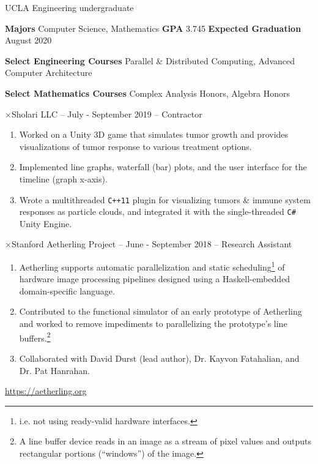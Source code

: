 \documentclass[11pt]{article}
\newcommand{\web}[1]{{ \color{webColor} \small \url{#1}}}
\newcommand{\myTitle}[1]{\vspace{2mm}{ \LARGE \color{titleColor} \textsf{#1}\vspace{2mm}}}
\newcommand{\mySub}[1]{{\color{subColor}$\times$\hspace{1mm}\textsf{#1}}}
\newcommand{\myKey}[1]{{\color{keyColor}\textbf{#1}}}
\newcommand{\GPA}{3.745}
\begin{document}
\begin{center}
\myTitle{David Zhao Akeley}

\vspace{-2.5mm}
{ \color{subColor} \textsf{UCLA Engineering undergraduate} }
\end{center}


\myKey{Majors} Computer Science, Mathematics
\hfill \myKey{GPA} \GPA
\hfill \myKey{Expected Graduation} August 2020

\myKey{Select Engineering Courses} Parallel \& Distributed Computing,
Advanced Computer Architecture

\myKey{Select Mathematics Courses} Complex Analysis Honors, Algebra Honors
\vspace{3mm}

\myTitle{Work Experience}

\mySub{Sholari LLC -- July - September 2019 -- Contractor}
\begin{enumerate}
\item Worked on a Unity 3D game that simulates tumor growth and
  provides visualizations of tumor response to various treatment
  options.
\item Implemented line graphs, waterfall (bar) plots, and the user
  interface for the timeline (graph x-axis).
\item Wrote a multithreaded \texttt{C++11} plugin for visualizing
  tumors \& immune system responses as particle clouds, and integrated
  it with the single-threaded \texttt{C\#} Unity Engine.
\end{enumerate}

\mySub{Stanford Aetherling Project -- June - September 2018 --
  Research Assistant}
\begin{enumerate}
\item Aetherling supports automatic parallelization and static
  scheduling\footnote{i.e. not using ready-valid hardware interfaces.}
  of hardware image processing pipelines designed using a
  Haskell-embedded domain-specific language.
\item Contributed to the functional simulator of an early prototype of
  Aetherling and worked to remove impediments to parallelizing the
  prototype's line buffers.\footnote{A line buffer device reads in an
    image as a stream of pixel values and outputs rectangular portions
    (``windows'') of the image.}
\item Collaborated with David Durst (lead author), Dr. Kayvon
  Fatahalian, and Dr. Pat Hanrahan.
\end{enumerate}
\web{https://aetherling.org}
\end{document}

